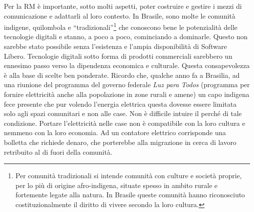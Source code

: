 Per la RM è importante, sotto molti aspetti, poter costruire e gestire
i mezzi di comunicazione e adattarli al loro contesto. In Brasile,
sono molte le comunità indigene, quilombola e
``tradizionali''\footnote{Per comunità tradizionali si intende
  comunità con culture e società proprie, per lo più di origine
  afro-indigena, situate spesso in ambito rurale e fortemente legate
  alla natura. In Brasile queste comunità hanno riconosciuto
  costituzionalmente il diritto di vivere secondo la loro cultura.}
che conoscono bene le potenzialità delle tecnologie digitali e stanno,
a poco a poco, cominciando a dominarle. Questo non sarebbe stato
possibile senza l'esistenza e l'ampia disponibilità di Software
Libero. Tecnologie digitali sotto forma di prodotti commerciali
sarebbero un ennesimo passo verso la dipendenza economica e
culturale. Questa consapevolezza è alla base di scelte ben
ponderate. Ricordo che, qualche anno fa a Brasilia, ad una riunione
del programma del governo federale \emph{Luz para Todos} (programma
per fornire elettricità anche alla popolazione in zone rurali e amene)
un capo indigena fece presente che pur volendo l'energia elettrica
questa dovesse essere limitata solo agli spazi comunitari e non alle
case. Non è difficile intuire il perché di tale condizione. Portare
l'elettricità nelle case non è compatibile con la loro cultura e
nemmeno con la loro economia. Ad un contatore elettrico corrisponde
una bolletta che richiede denaro, che porterebbe alla migrazione in
cerca di lavoro retribuito al di fuori della comunità.


